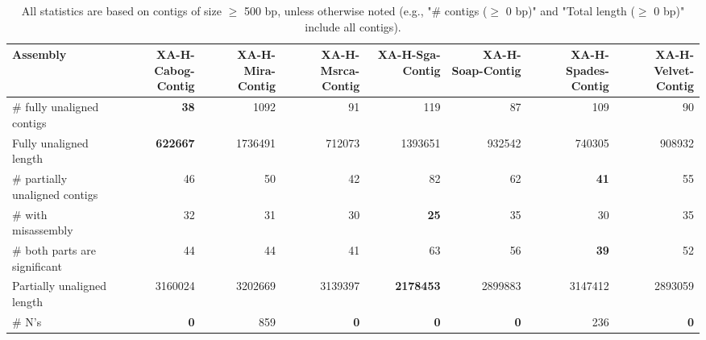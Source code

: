 \documentclass[12pt,a4paper]{article}
\begin{document}
\begin{table}[ht]
\begin{center}
\caption{All statistics are based on contigs of size $\geq$ 500 bp, unless otherwise noted (e.g., "\# contigs ($\geq$ 0 bp)" and "Total length ($\geq$ 0 bp)" include all contigs).}
\begin{tabular}{|l*{7}{|r}|}
\hline
Assembly & XA-H-Cabog-Contig & XA-H-Mira-Contig & XA-H-Msrca-Contig & XA-H-Sga-Contig & XA-H-Soap-Contig & XA-H-Spades-Contig & XA-H-Velvet-Contig \\ \hline
\# fully unaligned contigs & {\bf 38} & 1092 & 91 & 119 & 87 & 109 & 90 \\ \hline
Fully unaligned length & {\bf 622667} & 1736491 & 712073 & 1393651 & 932542 & 740305 & 908932 \\ \hline
\# partially unaligned contigs & 46 & 50 & 42 & 82 & 62 & {\bf 41} & 55 \\ \hline
\hspace{5mm}\# with misassembly & 32 & 31 & 30 & {\bf 25} & 35 & 30 & 35 \\ \hline
\hspace{5mm}\# both parts are significant & 44 & 44 & 41 & 63 & 56 & {\bf 39} & 52 \\ \hline
Partially unaligned length & 3160024 & 3202669 & 3139397 & {\bf 2178453} & 2899883 & 3147412 & 2893059 \\ \hline
\# N's & {\bf 0} & 859 & {\bf 0} & {\bf 0} & {\bf 0} & 236 & {\bf 0} \\ \hline
\end{tabular}
\end{center}
\end{table}
\end{document}
